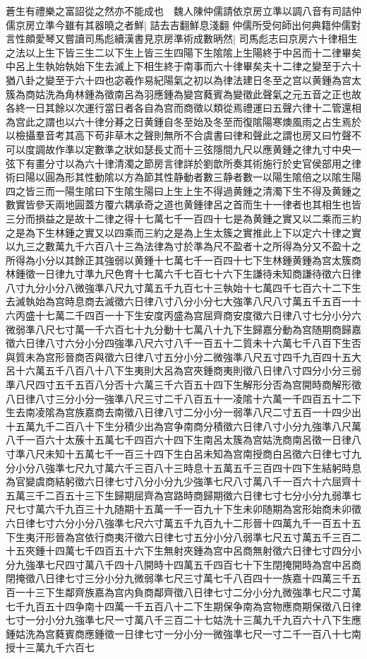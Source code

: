 蒼生有禮樂之富詔從之然亦不能成也　魏人陳仲儒請依京房立準以調八音有司詰仲儒京房立準今雖有其器曉之者鮮|{
	詰去吉翻鮮息淺翻}
仲儒所受何師出何典籍仲儒對言性頗愛琴又嘗讀司馬彪續漢書見京房準術成數昞然|{
	司馬彪志曰京房六十律相生之法以上生下皆三生二以下生上皆三生四陽下生隂隂上生陽終于中呂而十二律畢矣中呂上生執始執始下生去滅上下相生終于南事而六十律畢矣夫十二律之變至于六十猶八卦之變至于六十四也宓羲作易紀陽氣之初以為律法建日冬至之宫以黄鍾為宫太簇為商姑洗為角林鍾為徵南呂為羽應鍾為變宫蕤賓為變徵此聲氣之元五音之正也故各終一日其餘以次運行當日者各自為宫而商徵以類從焉禮運曰五聲六律十二管還相為宫此之謂也以六十律分朞之日黄鍾自冬至始及冬至而復隂陽寒燠風雨之占生焉於以檢攝羣音考其高下苟非草木之聲則無所不合虞書曰律和聲此之謂也房又曰竹聲不可以度調故作準以定數準之狀如瑟長丈而十三弦隱間九尺以應黄鍾之律九寸中央一弦下有畫分寸以為六十律清濁之節房言律詳於劉歆所奏其術施行於史官侯部用之律術曰陽以圓為形其性動隂以方為節其性静動者數三静者數一以陽生隂倍之以隂生陽四之皆三而一陽生隂曰下生隂生陽曰上生上生不得過黄鍾之清濁下生不得及黄鍾之數實皆參天兩地圓蓋方覆六耦承奇之道也黄鍾律呂之首而生十一律者也其相生也皆三分而損益之是故十二律之得十七萬七千一百四十七是為黄鍾之實又以二乘而三約之是為下生林鍾之實又以四乘而三約之是為上生太簇之實推此上下以定六十律之實以九三之數萬九千六百八十三為法律為寸於準為尺不盈者十之所得為分又不盈十之所得為小分以其餘正其強弱以黄鍾十七萬七千一百四十七下生林鍾黄鍾為宫太簇商林鍾徵一日律九寸準九尺色育十七萬六千七百七十六下生謙待未知商謙待徵六日律八寸九分小分八微強準八尺九寸萬五千九百七十三執始十七萬四千七百六十二下生去滅執始為宫時息商去滅徵六日律八寸八分小分七大強準八尺八寸萬五千五百一十六丙盛十七萬二千四百一十下生安度丙盛為宫屈齊商安度徵六日律八寸七分小分六微弱準八尺七寸萬一千六百七十九分動十七萬八十九下生歸嘉分動為宫随期商歸嘉徵六日律八寸六分小分四強準八尺六寸八千一百五十二質未十六萬七千八百下生否與質未為宫形晉商否與徵六日律八寸五分小分二微強準八尺五寸四千九百四十五大呂十六萬五千八百八十八下生夷則大呂為宫夾鍾商夷則徵八日律八寸四分小分三弱準八尺四寸五千五百八分否十六萬三千六百五十四下生解形分否為宫開時商解形徵八日律八寸三分小分一強準八尺三寸二千八百五十一凌隂十六萬一千四百五十二下生去南凌隂為宫族嘉商去南徵八日律八寸二分小分一弱準八尺二寸五百一十四少出十五萬九千二百八十下生分積少出為宫争南商分積徵六日律八寸小分九強準八尺萬八千一百六十太蔟十五萬七千四百六十四下生南呂太簇為宫姑洗商南呂徵一日律八寸準八尺未知十五萬七千一百三十四下生白呂未知為宫南授商白呂徵六日律七寸九分小分八強準七尺九寸萬六千三百八十三時息十五萬五千三百四十四下生結躬時息為官變虞商結躬徵六日律七寸八分小分九少強準七尺八寸萬八千一百六十六屈齊十五萬三千二百五十三下生歸期屈齊為宫路時商歸期徵六日律七寸七分小分九弱準七尺七寸萬六千九百三十九随期十五萬一千一百九十下生未卯随期為宮形始商未卯徵六日律七寸六分小分八強準七尺六寸萬五千九百九十二形晉十四萬九千一百五十五下生夷汗形晉為宫依行商夷汗徵六日律七寸五分小分八弱準七尺五寸萬五千三百二十五夾鍾十四萬七千四百五十六下生無射夾鍾為宫中呂商無射徵六日律七寸四分小分九強凖七尺四寸萬八千四十八開時十四萬五千四百七十下生閉掩開時為宫中呂商閉掩徵八日律七寸三分小分九微弱準七尺三寸萬七千八百四十一族嘉十四萬三千五百一十三下生鄰齊族嘉為宫内負商鄰齊徵八日律七寸二分小分九微強準七尺二寸萬七千九百五十四争南十四萬一千五百八十二下生期保争南為宫物應商期保徵八日律七寸一分小分九強準七尺一寸萬八千三百二十七姑洗十三萬九千九百六十八下生應鍾姑洗為宫蕤賓商應鍾徵一日律七寸一分小分一微強準七尺一寸二千一百八十七南授十三萬九千六百七}
